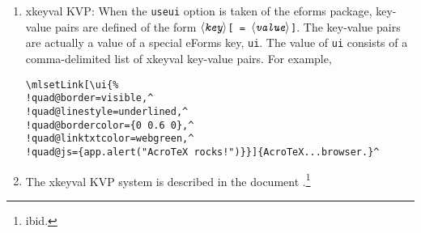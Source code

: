 \documentclass{article}
\makeatletter
\edef\amtIndent{\the\parindent}
\def\anglemeta#1{$\langle\textit{\texttt{#1}}\rangle$}
\let\pkg\textsf
\let\opt\texttt
\def\cs#1{\texttt{\@backslashchar#1}}
\makeatother
\begin{document}
\begin{enumerate}
    \item \pkg{xkeyval} KVP: When the \opt{useui} option is taken of the eforms package, key-value pairs are
        defined of the form \texttt{\anglemeta{key}[\,=\,\anglemeta{value}]}. The key-value pairs are actually a value of
        a special eForms key, \cs{ui}. The value of \cs{ui} consists of a comma-delimited list of
        \pkg{xkeyval} key-value pairs. For example,
\begin{Verbatim}[xleftmargin=\amtIndent,fontsize=\small,commandchars={!@^}]
\mlsetLink[\ui{%
!quad@border=visible,^
!quad@linestyle=underlined,^
!quad@bordercolor={0 0.6 0},^
!quad@linktxtcolor=webgreen,^
!quad@js={app.alert("AcroTeX rocks!")}}]{AcroTeX...browser.}^
\end{Verbatim}
    \item[] The \pkg{xkeyval} KVP system is described in the document
    \textsl{}.\footnote
    {ibid.}
\end{enumerate}
\end{document}
